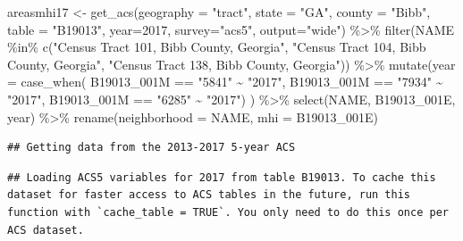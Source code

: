 \documentclass[
]{article}
\newenvironment{Shaded}{\begin{snugshade}}{\end{snugshade}}
\newcommand{\AttributeTok}[1]{\textcolor[rgb]{0.77,0.63,0.00}{#1}}
\newcommand{\DecValTok}[1]{\textcolor[rgb]{0.00,0.00,0.81}{#1}}
\newcommand{\FunctionTok}[1]{\textcolor[rgb]{0.00,0.00,0.00}{#1}}
\newcommand{\NormalTok}[1]{#1}
\newcommand{\OtherTok}[1]{\textcolor[rgb]{0.56,0.35,0.01}{#1}}
\newcommand{\SpecialCharTok}[1]{\textcolor[rgb]{0.00,0.00,0.00}{#1}}
\newcommand{\StringTok}[1]{\textcolor[rgb]{0.31,0.60,0.02}{#1}}
\begin{document}
\begin{Shaded}
\begin{Highlighting}[]
\NormalTok{areasmhi17 }\OtherTok{\textless{}{-}} \FunctionTok{get\_acs}\NormalTok{(}\AttributeTok{geography =} \StringTok{"tract"}\NormalTok{, }\AttributeTok{state =} \StringTok{"GA"}\NormalTok{, }\AttributeTok{county =} \StringTok{"Bibb"}\NormalTok{, }\AttributeTok{table =} \StringTok{"B19013"}\NormalTok{, }\AttributeTok{year=}\DecValTok{2017}\NormalTok{, }\AttributeTok{survey=}\StringTok{"acs5"}\NormalTok{, }\AttributeTok{output=}\StringTok{"wide"}\NormalTok{) }\SpecialCharTok{\%\textgreater{}\%}
\FunctionTok{filter}\NormalTok{(NAME }\SpecialCharTok{\%in\%} \FunctionTok{c}\NormalTok{(}\StringTok{"Census Tract 101, Bibb County, Georgia"}\NormalTok{, }\StringTok{"Census Tract 104, Bibb County, Georgia"}\NormalTok{, }\StringTok{"Census Tract 138, Bibb County, Georgia"}\NormalTok{)) }\SpecialCharTok{\%\textgreater{}\%}
\FunctionTok{mutate}\NormalTok{(}\AttributeTok{year =} \FunctionTok{case\_when}\NormalTok{(}
\NormalTok{  B19013\_001M }\SpecialCharTok{==} \StringTok{"5841"} \SpecialCharTok{\textasciitilde{}} \StringTok{"2017"}\NormalTok{,}
\NormalTok{  B19013\_001M }\SpecialCharTok{==} \StringTok{"7934"} \SpecialCharTok{\textasciitilde{}} \StringTok{"2017"}\NormalTok{,}
\NormalTok{  B19013\_001M }\SpecialCharTok{==} \StringTok{"6285"} \SpecialCharTok{\textasciitilde{}} \StringTok{"2017"}\NormalTok{) ) }\SpecialCharTok{\%\textgreater{}\%}
\FunctionTok{select}\NormalTok{(NAME, B19013\_001E, year) }\SpecialCharTok{\%\textgreater{}\%}
\FunctionTok{rename}\NormalTok{(}\AttributeTok{neighborhood =}\NormalTok{ NAME, }\AttributeTok{mhi =}\NormalTok{ B19013\_001E)}
\end{Highlighting}
\end{Shaded}

\begin{verbatim}
## Getting data from the 2013-2017 5-year ACS
\end{verbatim}

\begin{verbatim}
## Loading ACS5 variables for 2017 from table B19013. To cache this dataset for faster access to ACS tables in the future, run this function with `cache_table = TRUE`. You only need to do this once per ACS dataset.
\end{verbatim}
\end{document}
